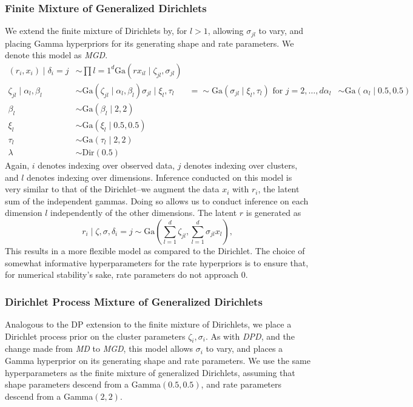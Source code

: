 \subsubsection{Finite Mixture of Generalized Dirichlets}
\label{model:mgd}
We extend the finite mixture of Dirichlets by, for $l > 1$, allowing $\sigma_{jl}$ to vary, and
  placing Gamma hyperpriors for its generating shape and rate parameters.  We denote this model as
  \emph{MGD}.
  \begin{equation}
    \label{eq:fm_gendirichlet}
    \begin{aligned}
    (r_i, x_i) \mid \delta_i=j &\sim \prod{l = 1}^d\text{Ga}(rx_{il}\mid \zeta_{jl}, \sigma_{jl})\\
        \zeta_{jl} \mid \alpha_l,\beta_l &\sim \text{Ga}(\zeta_{jl}\mid \alpha_l, \beta_l)
        \sigma_{jl} \mid \xi_l, \tau_l &=\sim \text{Ga}(\sigma_{jl}\mid \xi_l, \tau_l)
                                                                  \text{ for }j = 2,\ldots,d
        \alpha_l &\sim \text{Ga}(\alpha_l \mid 0.5, 0.5)\\
        \beta_l &\sim \text{Ga}(\beta_l \mid 2, 2)\\
        \xi_l &\sim \text{Ga}(\xi_l\mid 0.5, 0.5)\\
        \tau_l &\sim \text{Ga}(\tau_l\mid 2, 2)\\
        \lambda &\sim \text{Dir}(0.5)
    \end{aligned}
  \end{equation}
Again, $i$ denotes indexing over observed data, $j$ denotes indexing over clusters, and $l$ denotes
  indexing over dimensions.  Inference conducted on this model is very similar to that of the
  Dirichlet--we augment the data $x_i$ with $r_i$, the latent sum of the independent gammas.
  Doing so allows us to conduct inference on each dimension $l$ independently of the other
  dimensions.  The latent $r$ is generated as
  \begin{equation}
    r_i\mid \zeta, \sigma, \delta_i=j \sim
        \text{Ga}\left(\sum_{l = 1}^d\zeta_{jl},\sum_{l=1}^d\sigma_{jl}x_l\right),
  \end{equation}
This results in a more flexible model as compared to the Dirichlet.  The choice of somewhat
  informative hyperparameters for the rate hyperpriors is to ensure that, for numerical stability's
  sake, rate parameters do not approach 0.

\subsubsection{Dirichlet Process Mixture of Generalized Dirichlets}
\label{model:dpgd}
Analogous to the DP extension to the finite mixture of Dirichlets, we place a Dirichlet process
  prior on the cluster parameters $\zeta_i,\sigma_i$.  As with \emph{DPD}, and the change made from
  \emph{MD} to \emph{MGD}, this model allows $\sigma_i$ to vary, and places a Gamma hyperprior on
  its generating shape and rate parameters.  We use the same hyperparameters as the finite mixture
  of generalized Dirichlets, assuming that shape parameters descend from a Gamma$(0.5, 0.5)$, and
  rate parameters descend from a Gamma$(2,2)$.


